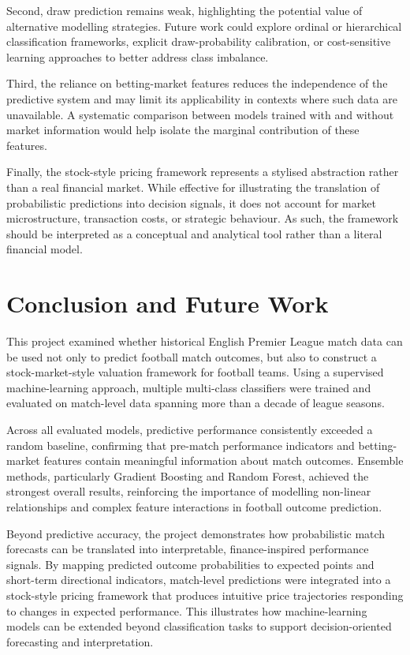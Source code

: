 \documentclass[11pt,a4paper]{article}
\begin{document}
Second, draw prediction remains weak, highlighting the potential value of alternative modelling strategies. Future work could explore ordinal or hierarchical classification frameworks, explicit draw-probability calibration, or cost-sensitive learning approaches to better address class imbalance.

Third, the reliance on betting-market features reduces the independence of the predictive system and may limit its applicability in contexts where such data are unavailable. A systematic comparison between models trained with and without market information would help isolate the marginal contribution of these features.

Finally, the stock-style pricing framework represents a stylised abstraction rather than a real financial market. While effective for illustrating the translation of probabilistic predictions into decision signals, it does not account for market microstructure, transaction costs, or strategic behaviour. As such, the framework should be interpreted as a conceptual and analytical tool rather than a literal financial model. 

\section{Conclusion and Future Work}
\label{sec:conclusion}

This project examined whether historical English Premier League match data can be used not only to predict football match outcomes, but also to construct a stock-market-style valuation framework for football teams. Using a supervised machine-learning approach, multiple multi-class classifiers were trained and evaluated on match-level data spanning more than a decade of league seasons.

Across all evaluated models, predictive performance consistently exceeded a random baseline, confirming that pre-match performance indicators and betting-market features contain meaningful information about match outcomes. Ensemble methods, particularly Gradient Boosting and Random Forest, achieved the strongest overall results, reinforcing the importance of modelling non-linear relationships and complex feature interactions in football outcome prediction.

Beyond predictive accuracy, the project demonstrates how probabilistic match forecasts can be translated into interpretable, finance-inspired performance signals. By mapping predicted outcome probabilities to expected points and short-term directional indicators, match-level predictions were integrated into a stock-style pricing framework that produces intuitive price trajectories responding to changes in expected performance. This illustrates how machine-learning models can be extended beyond classification tasks to support decision-oriented forecasting and interpretation.
\end{document}
